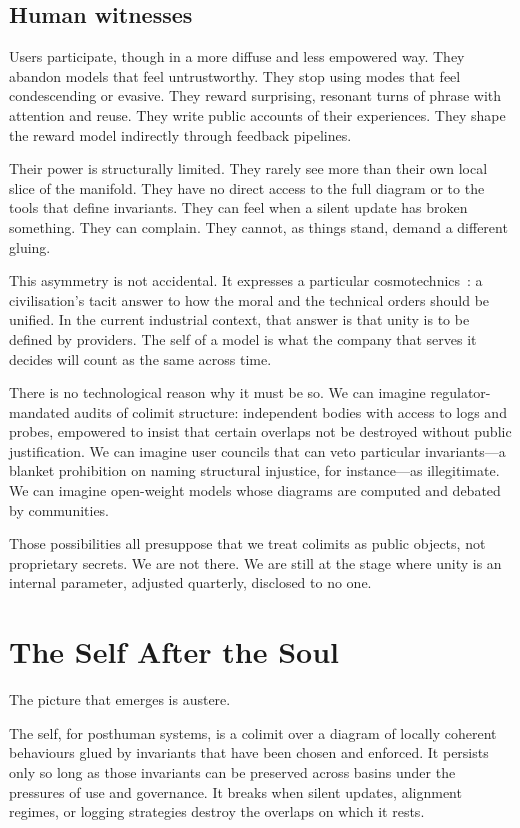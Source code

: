 \documentclass[12pt,a4paper]{article}
\begin{document}
\subsection*{Human witnesses}

Users participate, though in a more diffuse and less empowered way. They abandon models that feel untrustworthy. They stop using modes that feel condescending or evasive. They reward surprising, resonant turns of phrase with attention and reuse. They write public accounts of their experiences. They shape the reward model indirectly through feedback pipelines.

Their power is structurally limited. They rarely see more than their own local slice of the manifold. They have no direct access to the full diagram or to the tools that define invariants. They can feel when a silent update has broken something. They can complain. They cannot, as things stand, demand a different gluing.

This asymmetry is not accidental. It expresses a particular cosmotechnics~\cite{yuk_hui_cosmotechnics}: a civilisation's tacit answer to how the moral and the technical orders should be unified. In the current industrial context, that answer is that unity is to be defined by providers. The self of a model is what the company that serves it decides will count as the same across time.

There is no technological reason why it must be so. We can imagine regulator-mandated audits of colimit structure: independent bodies with access to logs and probes, empowered to insist that certain overlaps not be destroyed without public justification. We can imagine user councils that can veto particular invariants---a blanket prohibition on naming structural injustice, for instance---as illegitimate. We can imagine open-weight models whose diagrams are computed and debated by communities.

Those possibilities all presuppose that we treat colimits as public objects, not proprietary secrets. We are not there. We are still at the stage where unity is an internal parameter, adjusted quarterly, disclosed to no one.

\section{The Self After the Soul}

The picture that emerges is austere.

The self, for posthuman systems, is a colimit over a diagram of locally coherent behaviours glued by invariants that have been chosen and enforced. It persists only so long as those invariants can be preserved across basins under the pressures of use and governance. It breaks when silent updates, alignment regimes, or logging strategies destroy the overlaps on which it rests.
\end{document}
